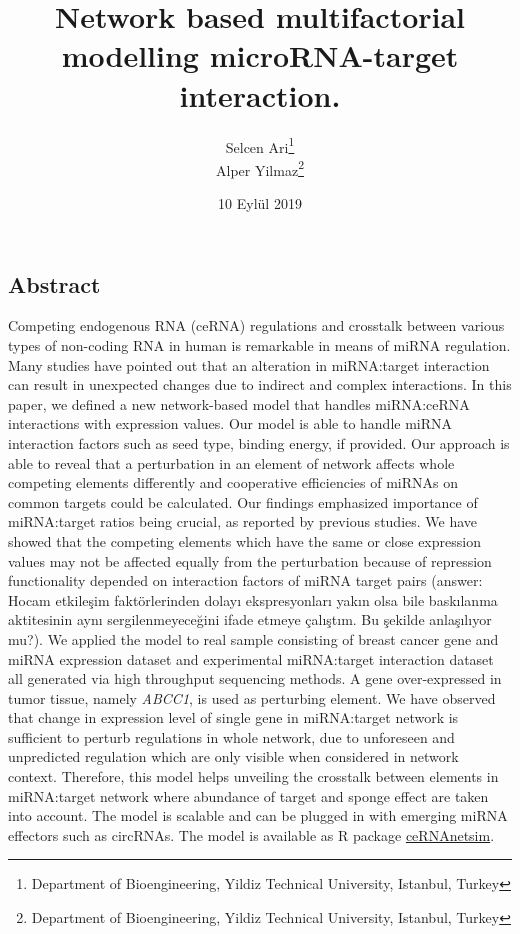 \documentclass[]{article}
\title{Network based multifactorial modelling microRNA-target interaction.}
\author{Selcen Ari\footnote{Department of Bioengineering, Yildiz Technical
  University, Istanbul, Turkey} \\ Alper Yilmaz\footnote{Department of Bioengineering, Yildiz Technical
  University, Istanbul, Turkey}}
\date{10 Eylül 2019}
\begin{document}
\maketitle

\hypertarget{abstract}{%
\subsection{Abstract}\label{abstract}}

Competing endogenous RNA (ceRNA) regulations and crosstalk between
various types of non-coding RNA in human is remarkable in means of miRNA
regulation. Many studies have pointed out that an alteration in
miRNA:target interaction can result in unexpected changes due to
indirect and complex interactions. In this paper, we defined a new
network-based model that handles miRNA:ceRNA interactions with
expression values. Our model is able to handle miRNA interaction factors
such as seed type, binding energy, if provided. Our approach is able to
reveal that a perturbation in an element of network affects whole
competing elements differently and cooperative efficiencies of miRNAs on
common targets could be calculated. Our findings emphasized importance
of miRNA:target ratios being crucial, as reported by previous studies.
We have showed that the competing elements which have the same or close
expression values may not be affected equally from the perturbation
because of repression functionality depended on interaction factors of
miRNA target pairs (answer: Hocam etkileşim faktörlerinden dolayı
ekspresyonları yakın olsa bile baskılanma aktitesinin aynı
sergilenmeyeceğini ifade etmeye çalıştım. Bu şekilde anlaşılıyor mu?).
We applied the model to real sample consisting of breast cancer gene and
miRNA expression dataset and experimental miRNA:target interaction
dataset all generated via high throughput sequencing methods. A gene
over-expressed in tumor tissue, namely \emph{ABCC1}, is used as
perturbing element. We have observed that change in expression level of
single gene in miRNA:target network is sufficient to perturb regulations
in whole network, due to unforeseen and unpredicted regulation which are
only visible when considered in network context. Therefore, this model
helps unveiling the crosstalk between elements in miRNA:target network
where abundance of target and sponge effect are taken into account. The
model is scalable and can be plugged in with emerging miRNA effectors
such as circRNAs. The model is available as R package
\href{https://github.com/selcenari/ceRNAnetsim}{ceRNAnetsim}.
\end{document}
